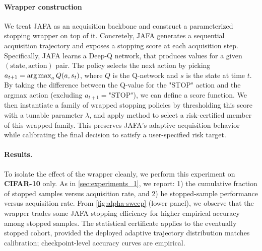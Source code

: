 \paragraph{Wrapper construction}
We treat JAFA as an acquisition backbone and construct a parameterized stopping wrapper on top of it. Concretely, JAFA generates a sequential acquisition trajectory and exposes a stopping score at each acquisition step. Specifically, JAFA learns a Deep-Q network, that produces values for a given $(\text{state},\text{action})$ pair. The policy selects the next action by picking $a_{t+1} = \operatorname*{arg\,max}_a Q(a,s_t)$, where $Q$ is the Q-network and $s$ is the state at time $t$. By taking the difference between the Q-value for the "STOP" action and the argmax action (excluding $a_{t+1} = \text{"STOP"}$), we can define a score function. We then instantiate a family of wrapped stopping policies by thresholding this score with a tunable parameter $\lambda$, and apply \gls{method} to select a risk-certified member of this wrapped family. This preserves JAFA's adaptive acquisition behavior while calibrating the final decision to satisfy a user-specified risk target.


\paragraph{Results.}
To isolate the effect of the wrapper cleanly, we perform this experiment on \textbf{CIFAR-10} only. As in \ref{sec:experiments_1}, we report: 1)  the cumulative fraction of stopped samples versus acquisition rate, and 2) he stopped-sample performance versus acquisition rate.
From \cref{fig:alpha-sweep} (lower panel), 
we observe that the wrapper trades some JAFA stopping efficiency for higher empirical accuracy among stopped samples. The statistical certificate applies to the eventually stopped cohort, provided the deployed adaptive trajectory distribution matches calibration; checkpoint-level accuracy curves are empirical.

